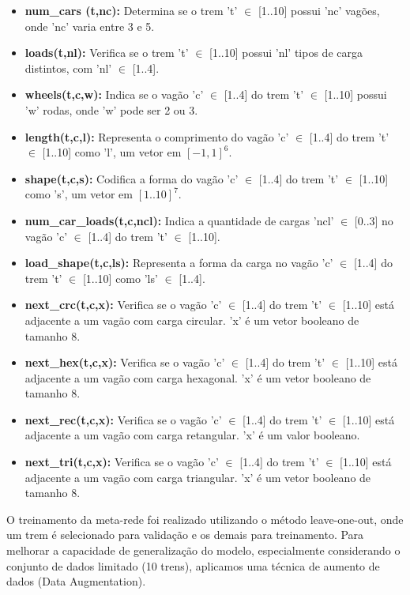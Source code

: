 \documentclass[12pt]{article}
\begin{document}
\begin{itemize}
    \item \textbf{num\_cars (t,nc):} Determina se o trem 't' $\in$ [1..10] possui 'nc' vagões, onde 'nc' varia entre 3 e 5.
    \item \textbf{loads(t,nl):} Verifica se o trem 't' $\in$ [1..10] possui 'nl' tipos de carga distintos, com 'nl' $\in$ [1..4].
    \item \textbf{wheels(t,c,w):}  Indica se o vagão 'c' $\in$ [1..4] do trem 't' $\in$ [1..10] possui 'w' rodas, onde 'w' pode ser 2 ou 3.
    \item \textbf{length(t,c,l):} Representa o comprimento do vagão 'c' $\in$ [1..4] do trem 't' $\in$ [1..10] como 'l', um vetor em \([-1, 1]^6\). 
    \item \textbf{shape(t,c,s):} Codifica a forma do vagão 'c' $\in$ [1..4] do trem 't' $\in$ [1..10] como 's', um vetor em \([1..10]^7\).
    \item \textbf{num\_car\_loads(t,c,ncl):}  Indica a quantidade de cargas 'ncl' $\in$ [0..3] no vagão 'c' $\in$ [1..4] do trem 't' $\in$ [1..10].
    \item \textbf{load\_shape(t,c,ls):}  Representa a forma da carga no vagão 'c' $\in$ [1..4] do trem 't' $\in$ [1..10] como 'ls' $\in$ [1..4].
    \item \textbf{next\_crc(t,c,x):}  Verifica se o vagão 'c' $\in$ [1..4] do trem 't' $\in$ [1..10] está adjacente a um vagão com carga circular. 'x' é um vetor booleano de tamanho 8.
    \item \textbf{next\_hex(t,c,x):}  Verifica se o vagão 'c' $\in$ [1..4] do trem 't' $\in$ [1..10] está adjacente a um vagão com carga hexagonal. 'x' é um vetor booleano de tamanho 8.
    \item \textbf{next\_rec(t,c,x):}  Verifica se o vagão 'c' $\in$ [1..4] do trem 't' $\in$ [1..10] está adjacente a um vagão com carga retangular. 'x' é um valor booleano.
    \item \textbf{next\_tri(t,c,x):}  Verifica se o vagão 'c' $\in$ [1..4] do trem 't' $\in$ [1..10] está adjacente a um vagão com carga triangular. 'x' é um vetor booleano de tamanho 8.
\end{itemize}

O treinamento da meta-rede foi realizado utilizando o método leave-one-out, onde um trem é selecionado para validação e os demais para treinamento. Para melhorar a capacidade de generalização do modelo, especialmente considerando o conjunto de dados limitado (10 trens), aplicamos uma técnica de aumento de dados (Data Augmentation). 
\end{document}
